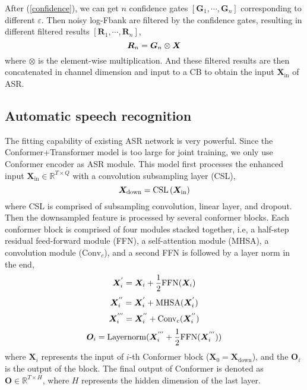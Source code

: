\documentclass{article}
\begin{document}
	After (\ref{confidence}), we can get $n$ confidence gates $\left[\bm{G}_1,\cdots,\bm{G}_n \right]$ corresponding to different $\varepsilon$. Then noisy log-Fbank are filtered by the confidence gates, resulting in different filtered results $\left[\bm{R}_1,\cdots,\bm{R}_n\right]$,
	\begin{equation}
		\setlength{\abovedisplayskip}{3pt}
		\setlength{\belowdisplayskip}{3pt}
		\label{selectedregion}
		\bm{R}_n = \bm{G}_n \otimes \bm{X}
	\end{equation}
	where $\otimes$ is the element-wise multiplication. And these filtered results are then concatenated in channel dimension and input to a CB to obtain the input $\bm{X}_\text{in}$ of ASR.
	
	
	\subsection{Automatic speech recognition}
	The fitting capability of existing ASR network is very powerful. Since the Conformer+Transformer model is too large for joint training, we only use Conformer encoder \cite{conformer} as ASR module. This model first processes the enhanced input $\bm{X}_\text{in} \in \mathbb{R}^{T \times Q}$ with a convolution subsampling layer (CSL),
	\begin{equation}
		\setlength{\abovedisplayskip}{3pt}
		\setlength{\belowdisplayskip}{3pt}
		\bm{X}_\text{down} =  \text{CSL}\left(\bm{X}_\text{in}\right)
	\end{equation}
	where CSL is comprised of subsampling convolution, linear layer, and dropout. Then the downsampled feature is processed by several conformer blocks. Each conformer block is comprised of four modules stacked together, i.e, a half-step residual feed-forward module (FFN), a self-attention module (MHSA), a convolution module ($\text{Conv}_c$), and a second FFN is followed by a layer norm \cite{layernorm}  in the end,
	\begin{equation}
		\setlength{\abovedisplayskip}{3pt}
		\setlength{\belowdisplayskip}{3pt}
		\bm{X}_i^{'} = \bm{X}_i + \frac{1}{2} \text{FFN}(\bm{X}_i) 
	\end{equation}
	\begin{equation}
		\setlength{\abovedisplayskip}{3pt}
		\setlength{\belowdisplayskip}{3pt}
		\bm{X}_i^{''} = \bm{X}_i^{'} + \text{MHSA}(\bm{X}_i^{'})
	\end{equation}
	\begin{equation}
		\setlength{\abovedisplayskip}{3pt}
		\setlength{\belowdisplayskip}{3pt}
		\bm{X}_i^{'''}=\bm{X}_i^{''}+\text{Conv}_c(\bm{X}_i^{''})
	\end{equation}
	\begin{equation}
		\setlength{\abovedisplayskip}{3pt}
		\setlength{\belowdisplayskip}{3pt}
		\bm{O}_i = \text{Layernorm}(\bm{X}_i^{'''}+\frac{1}{2}\text{FFN}(\bm{X}_i^{'''}))
		\label{O}
	\end{equation}
	where $\bm{X}_i$ represents the input of $i$-th Conformer block ($\bm{X}_0=\bm{X}_\text{down}$), and the $\bm{O}_i$ is the output of the block. The final output of Conformer is denoted as $\bm{O} \in \mathbb{R}^{T\times H}$, where $H$ represents the hidden dimension of the last layer.
	
\end{document}

